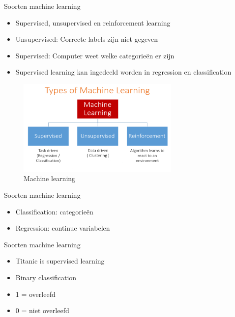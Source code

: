 \documentclass[presentation]{beamer}
\begin{document}
\begin{frame}[label={sec:org1100fcd}]{Soorten machine learning}
\begin{itemize}
\item Supervised, unsupervised en reinforcement learning
\item Unsupervised: Correcte labels zijn \alert{niet} gegeven
\item Supervised: Computer weet welke categorieën er zijn
\item Supervised learning kan ingedeeld worden in regression en classification
\end{itemize}

\begin{figure}[htbp]
\centering
\includegraphics[width=300]{./typesmachinelearning.png}
\caption{Machine learning}
\end{figure}
\end{frame}


\begin{frame}[label={sec:orgd9c3061}]{Soorten machine learning}
\begin{itemize}
\item Classification: categorieën
\item Regression: continue variabelen
\end{itemize}
\end{frame}


\begin{frame}[label={sec:orgcd7091f}]{Soorten machine learning}
\begin{itemize}
\item Titanic is supervised learning
\item Binary classification
\item 1 = overleefd
\item 0 = niet overleefd
\end{itemize}
\end{frame}
\end{document}
